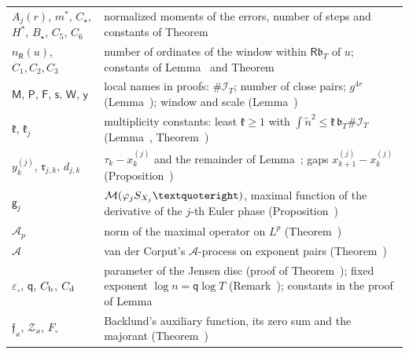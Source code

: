 \documentclass[preprint,12pt]{elsarticle}
\makeatletter
\let\CG@origref\ref
\newcommand{\CG@gettip}[1]{\@ifundefined{CGTip@#1}{Reference: #1}{\csname CGTip@#1\endcsname}}
\DeclareRobustCommand{\CGref}[1]{\pdftooltip{\CG@origref{#1}}{\CG@gettip{#1}}}
\numberwithin{equation}{section}
\theoremstyle{plain}
\theoremstyle{definition}
\theoremstyle{remark}
\newcommand{\IT}{\mathcal I_T}
\makeatother
\begin{document}
\begin{center}
\begin{longtable}{p{}p{}}
$A_j(r)$, $m^*$, $C_\star$, $H^*$, $B_\star$, $C_5$, $C_6$ & normalized moments of the errors, number of steps and constants of Theorem~\CGref{thm:uniform_iteration}\\
$n_{\mathsf R}(u)$, $C_1,C_2,C_3$ & number of ordinates of the window within $\mathsf R\mathfrak b_T$ of $u$; constants of Lemma~\CGref{lem:zero_pairs} and Theorem~\CGref{thm:multiplicity_all}\\
$\mathsf M$, $\mathsf P$, $\mathsf F$, $\mathsf s$, $\mathsf W$, $\mathsf y$ & local names in proofs: $\#\IT$; number of close pairs; $g^{4r}$ (Lemma~\CGref{lem:sampling_rho}); window and scale (Lemma~\CGref{lem:maximal_primes})\\
$\mathfrak k$, $\mathfrak k_j$ & multiplicity constants: least $\mathfrak k\ge1$ with $\int\tilde n^2\le\mathfrak k\,\mathfrak b_T\#\IT$ (Lemma~\CGref{lem:sampling_rho}, Theorem~\CGref{thm:uniform_iteration})\\
$y^{(j)}_k$, $\mathfrak r_{j,k}$, $d_{j,k}$ & $\tau_k-x^{(j)}_k$ and the remainder of Lemma~\CGref{lem:second_identity}; gaps $x^{(j)}_{k+1}-x^{(j)}_k$ (Proposition~\CGref{prop:deformation})\\
$\mathsf g_j$ & $\mathcal M(\varphi_jS_{X_j}\textquoteright)$, maximal function of the derivative of the $j$-th Euler phase (Proposition~\CGref{prop:recursion})\\
$\mathcal A_p$ & norm of the maximal operator on $L^p$ (Theorem~\CGref{thm:known_maximal})\\
$\mathscr A$ & van der Corput\textquoteright s $\mathscr A$-process on exponent pairs (Theorem~\CGref{thm:known_exponents})\\
$\varepsilon_\circ$, $\mathsf q$, $C_{\rm b}$, $C_{\rm d}$ & parameter of the Jensen disc (proof of Theorem~\CGref{thm:envelope}); fixed exponent $\log n=\mathsf q\log T$ (Remark~\CGref{rem:transport}); constants in the proof of Lemma~\CGref{lem:higher_moments}\\
$\mathfrak f_\varkappa$, $\mathcal Z_\varkappa$, $F_\circ$ & Backlund's auxiliary function, its zero sum and the majorant (Theorem~\CGref{thm:known_backlund})\\
\end{longtable}
\end{center}
\end{document}
